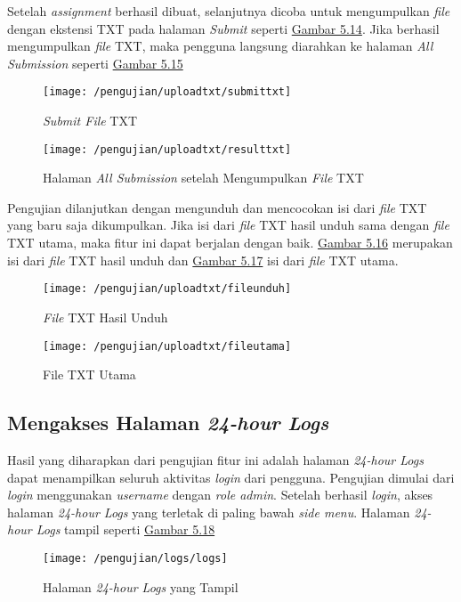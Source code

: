 	Setelah \textit{assignment} berhasil dibuat, selanjutnya dicoba untuk mengumpulkan \textit{file} dengan ekstensi TXT pada halaman \textit{Submit} seperti \hyperref[fig:submittxt]{Gambar 5.14}. Jika berhasil mengumpulkan \textit{file} TXT, maka pengguna langsung diarahkan ke halaman \textit{All Submission} seperti \hyperref[fig:resultttxt]{Gambar 5.15}
	
	\begin{figure}[H]
		\centering  
		\texttt{[image: /pengujian/uploadtxt/submittxt]}  
		\caption[\textit{Submit File} TXT]{\textit{Submit File} TXT} 
		\label{fig:submittxt} 
	\end{figure}

	\begin{figure}[H]
		\centering  
		\texttt{[image: /pengujian/uploadtxt/resulttxt]}  
		\caption[Halaman \textit{All Submission} setelah Mengumpulkan \textit{File} TXT]{Halaman \textit{All Submission} setelah Mengumpulkan \textit{File} TXT} 
		\label{fig:resultttxt} 
	\end{figure}

	Pengujian dilanjutkan dengan mengunduh dan mencocokan isi dari \textit{file} TXT yang baru saja dikumpulkan. Jika isi dari \textit{file} TXT hasil unduh sama dengan \textit{file} TXT utama, maka fitur ini dapat berjalan dengan baik. \hyperref[fig:fileunduh]{Gambar 5.16} merupakan isi dari \textit{file} TXT hasil unduh dan \hyperref[fig:fileutama]{Gambar 5.17} isi dari \textit{file} TXT utama.
	
	\begin{figure}[H]
		\centering  
		\texttt{[image: /pengujian/uploadtxt/fileunduh]}  
		\caption[\textit{File} TXT Hasil Unduh]{\textit{File} TXT Hasil Unduh} 
		\label{fig:fileunduh} 
	\end{figure}
	
	\begin{figure}[H]
		\centering  
		\texttt{[image: /pengujian/uploadtxt/fileutama]}  
		\caption[File TXT Utama]{File TXT Utama} 
		\label{fig:fileutama} 
	\end{figure}

	\subsection{Mengakses Halaman \textit{24-hour Logs}}
	Hasil yang diharapkan dari pengujian fitur ini adalah halaman \textit{24-hour Logs} dapat menampilkan seluruh aktivitas \textit{login} dari pengguna. Pengujian dimulai dari \textit{login} menggunakan \textit{username} dengan \textit{role admin}. Setelah berhasil \textit{login}, akses halaman \textit{24-hour Logs} yang terletak di paling bawah \textit{side menu}. Halaman \textit{24-hour Logs} tampil seperti \hyperref[fig:logs]{Gambar 5.18}
	\begin{figure}[H]
		\centering  
		\texttt{[image: /pengujian/logs/logs]}  
		\caption[Halaman \textit{24-hour Logs} yang Tampil]{Halaman \textit{24-hour Logs} yang Tampil} 
		\label{fig:logs} 
	\end{figure}

